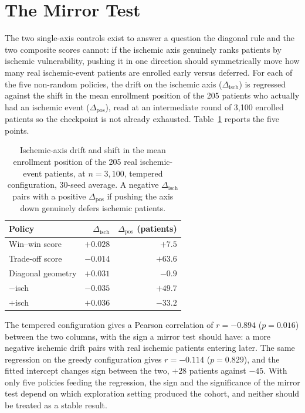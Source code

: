 \section{The Mirror Test}

The two single-axis controls exist to answer a question the diagonal rule and the two
composite scores cannot: if the ischemic axis genuinely ranks patients by ischemic
vulnerability, pushing it in one direction should symmetrically move how many real
ischemic-event patients are enrolled early versus deferred. For each of the five
non-random policies, the drift on the ischemic axis ($\Delta_{\text{isch}}$) is regressed
against the shift in the mean enrollment position of the 205 patients who actually had an
ischemic event ($\Delta_{\text{pos}}$), read at an intermediate round of 3,100 enrolled
patients so the checkpoint is not already exhausted. Table~\ref{tab:ch8-mirror} reports
the five points.

\begin{table}[h]
\centering
\caption{Ischemic-axis drift and shift in the mean enrollment position of the 205
real ischemic-event patients, at $n=3{,}100$, tempered configuration, 30-seed average.
A negative $\Delta_{\text{isch}}$ pairs with a positive $\Delta_{\text{pos}}$ if pushing
the axis down genuinely defers ischemic patients.}
\label{tab:ch8-mirror}
\begin{tabular}{lrr}
\toprule
Policy & $\Delta_{\text{isch}}$ & $\Delta_{\text{pos}}$ (patients) \\
\midrule
Win--win score      & $+0.028$ & $+7.5$ \\
Trade-off score      & $-0.014$ & $+63.6$ \\
Diagonal geometry     & $+0.031$ & $-0.9$ \\
$-$isch              & $-0.035$ & $+49.7$ \\
$+$isch              & $+0.036$ & $-33.2$ \\
\bottomrule
\end{tabular}
\end{table}

The tempered configuration gives a Pearson correlation of $r = -0.894$ ($p = 0.016$)
between the two columns, with the sign a mirror test should have: a more negative
ischemic drift pairs with real ischemic patients entering later. The same regression on
the greedy configuration gives $r = -0.114$ ($p = 0.829$), and the fitted intercept
changes sign between the two, $+28$ patients against $-45$. With only five policies
feeding the regression, the sign and the significance of the mirror test depend on which
exploration setting produced the cohort, and neither should be treated as a stable
result.

